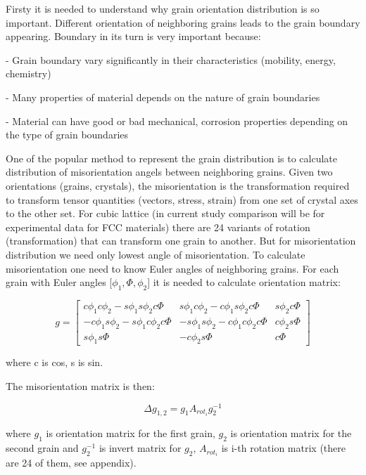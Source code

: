 \documentclass[12pt]{report}
\begin{document}
Firsty it is needed to understand why grain orientation distribution is so important. Different orientation of neighboring grains leads to the grain boundary appearing. Boundary in its turn is very important because:

- Grain boundary vary significantly in their characteristics (mobility, energy, chemistry)

- Many properties of material depends on the nature of grain boundaries

- Material can have good or bad mechanical, corrosion properties depending on the type of grain boundaries
  
One of the popular method to represent the grain distribution is to calculate distribution of misorientation angels between neighboring grains. Given two orientations (grains, crystals), the misorientation is the transformation required to transform tensor quantities (vectors, stress, strain) from one set of crystal axes to the other set. For cubic lattice (in current study comparison will be for experimental data for FCC materials) there are 24 variants of rotation (transformation) that can transform one grain to another. But for misorientation distribution we need only lowest angle of misorientation. To calculate misorientation one need to know Euler angles of neighboring grains. For each grain with Euler angles [$\phi_1, \Phi, \phi_2$] it is needed to calculate orientation matrix:

\begin{equation} \label{orientmatrix}
g = \begin{bmatrix}
    c\phi_1c\phi_2 - s\phi_1s\phi_2c\Phi & s\phi_1c\phi_2 - c\phi_1s\phi_2c\Phi & s\phi_2c\Phi \\
    -c\phi_1s\phi_2 - s\phi_1c\phi_2c\Phi & -s\phi_1s\phi_2 - c\phi_1c\phi_2c\Phi & c\phi_2s\Phi \\
    s\phi_1s\Phi & -c\phi_2s\Phi & c\Phi
\end{bmatrix}
\end{equation}
\bigbreak

where c is cos, s is sin.

The misorientation matrix is then:

\begin{equation} \label{mismatrix}
\Delta g_{1,2} = g_1A_{rot_i}g^{-1}_2
\end{equation}
\bigbreak

where $g_1$ is orientation matrix for the first grain, $g_2$ is orientation matrix for the second grain and $g^{-1}_2$ is invert matrix for $g_2$, $A_{rot_i}$ is i-th rotation matrix (there are 24 of them, see appendix).
\end{document}
